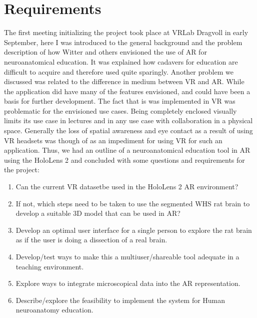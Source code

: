 \chapter{Requirements}\label{chap:req}



%
%


The first meeting initializing the project took place at VRLab Dragvoll in early September, here I was introduced to the general background and the problem description of how Witter and others envisioned the use of AR for neuroanatomical education. It was explained how cadavers for education are difficult to acquire and therefore used quite sparingly. 
Another problem we discussed was related to the difference in medium between VR and AR. While the application  did have many of the features envisioned, and could have been a basis for further development. The fact that is was implemented in VR was problematic for the envisioned use cases. Being completely enclosed visually limits its use case in lectures and in any use case with collaboration in a physical space. Generally the loss of spatial awareness and eye contact as a result of using VR headsets was though of as an impediment for using VR for such an application. 
Thus, we had an outline of a neuroanatomical education tool in AR using the HoloLens 2 and concluded with some questions and requirements for the project:

\begin{enumerate}\label{mennoslist}
    \item Can the current VR dataset\footnotemark be used in the HoloLens 2 AR environment?
    \item If not, which steps need to be taken to use the segmented WHS rat brain to develop a suitable 3D model that can be used in AR?
    \item Develop an optimal user interface for a single person to explore the rat brain as if the user is doing a dissection of a real brain.
    \item Develop/test ways to make this a multiuser/shareable tool adequate in a teaching environment.
    \item Explore ways to integrate microscopical data into the AR representation.
    \item Describe/explore the feasibility to implement the system for Human neuroanatomy education.
\end{enumerate}

